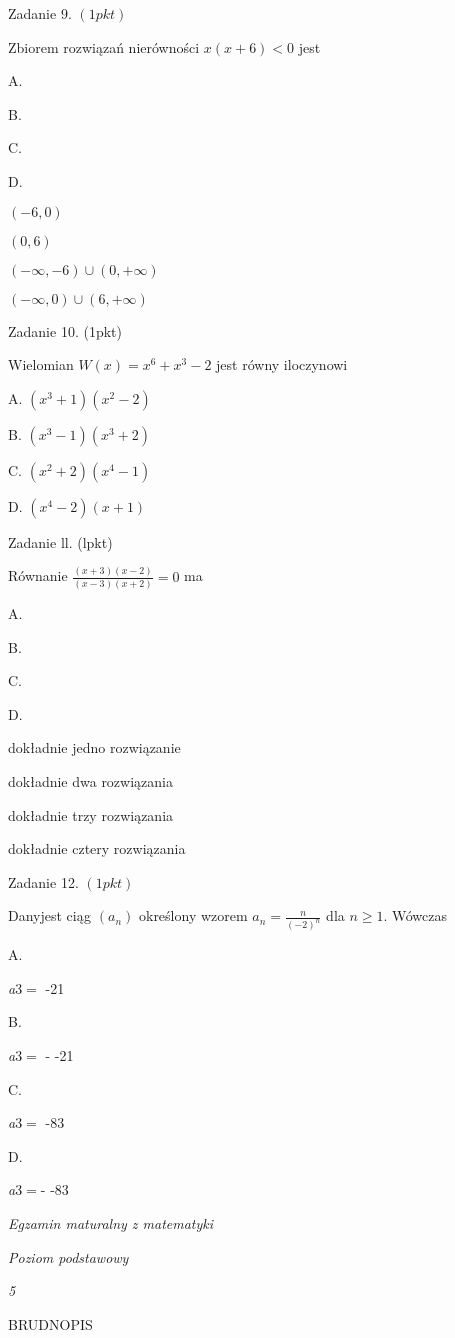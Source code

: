 \documentclass[a4paper,12pt]{article}
\begin{document}
Zadanie 9. $(1pkt)$

Zbiorem rozwiązań nierówności $x(x+6)<0$ jest

A.

B.

C.

D.

$(-6,0)$

$(0,6)$

$(-\infty,-6)\cup(0,+\infty)$

$(-\infty,0)\cup(6,+\infty)$

Zadanie 10. (1pkt)

Wielomian $W(x)=x^{6}+x^{3}-2$ jest równy iloczynowi

A. $(x^{3}+1)(x^{2}-2)$

B. $(x^{3}-1)(x^{3}+2)$

C. $(x^{2}+2)(x^{4}-1)$

D. $(x^{4}-2)(x+1)$

Zadanie ll. (lpkt)

Równanie $\displaystyle \frac{(x+3)(x-2)}{(x-3)(x+2)}=0$ ma

A.

B.

C.

D.

dokładnie jedno rozwiązanie

dokładnie dwa rozwiązania

dokładnie trzy rozwiązania

dokładnie cztery rozwiązania

Zadanie 12. $(1pkt)$

Danyjest ciąg $(a_{n})$ określony wzorem $a_{n}=\displaystyle \frac{n}{(-2)^{n}}$ dla $n\geq 1$. Wówczas

A.

{\it a}3$=$ -21

B.

{\it a}3$=$ - -21

C.

{\it a}3$=$ -83

D.

{\it a}3$=$- -83





{\it Egzamin maturalny z matematyki}

{\it Poziom podstawowy}

{\it 5}

BRUDNOPIS
\end{document}
